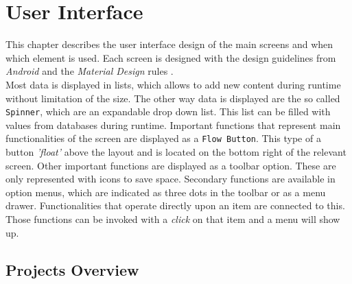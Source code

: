 \section{User Interface}

This chapter describes the user interface design of the main screens and when which element is used. Each screen is designed with the design guidelines from \textit{Android} and the \textit{Material Design} rules \cite{materialdesign}. \\
Most data is displayed in lists, which allows to add new content during runtime without limitation of the size. The other way data is displayed are the so called \texttt{Spinner}, which are an expandable drop down list. This list can be filled with values from databases during runtime. Important functions that represent main functionalities of the screen are displayed as a \texttt{Flow Button}. This type of a button \textit{'float'} above the layout and is located on the bottom right of the relevant screen. Other important functions are displayed as a toolbar option. These are only represented with icons to save space. Secondary functions are available in option menus, which are indicated as three dots in the toolbar or as a menu drawer. Functionalities that operate directly upon an item are connected to this. Those functions can be invoked with a \textit{click} on that item and a menu will show up. 

\subsection{Projects Overview}

